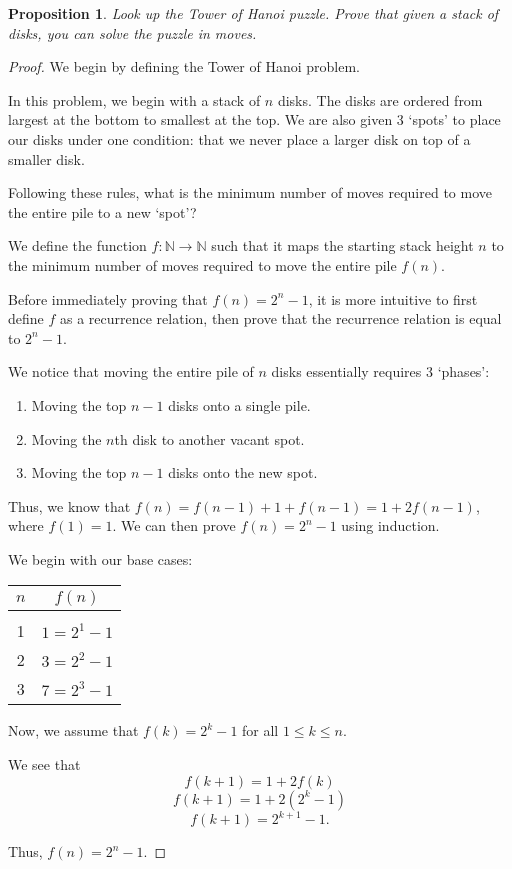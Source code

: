 \documentclass{article}
\newtheorem{proposition}{Proposition}
\theoremstyle{definition}
\begin{document}
\begin{proposition}
Look up the Tower of Hanoi puzzle. Prove that given a stack of 
disks, you can solve the puzzle in moves.

\end{proposition}
\begin{proof}
    We begin by defining the Tower of Hanoi problem. 
    
    In this problem, we begin 
    with a stack of \(n\) disks. The disks are ordered from largest at the bottom 
    to smallest at the top. We are also given 3 `spots' to place our disks under 
    one condition: that we never place a larger disk on top of a smaller disk. 

    Following these rules, what is the minimum number of moves required to move
    the entire pile to a new `spot'?
    
    We define the function \(f: \mathbb{N} \rightarrow \mathbb{N}\) such that it 
    maps the starting stack height \(n\) to the minimum number of moves required 
    to move the entire pile \(f(n)\).

    Before immediately proving that \(f(n) = 2^n - 1\), it is more intuitive to 
    first define \(f\) as a recurrence relation, then prove that the recurrence
    relation is equal to \(2^n -1\).

    We notice that moving the entire pile  of \(n\) disks essentially requires 3 `phases':
    \begin{enumerate}
        \item Moving the top \(n-1\) disks onto a single pile.
        \item Moving the \(n\)th disk to another vacant spot.
        \item Moving the top \(n-1\) disks onto the new spot.
    \end{enumerate}

    Thus, we know that \(f(n) = f(n-1) + 1 + f(n-1) = 1 + 2f(n-1)\), where \(f(1) = 1\).
    We can then prove \(f(n) = 2^n -1\) using induction. 

    We begin with our base cases:
    \begin{center}
        \begin{tabular}{c c}
            \(n\)   & \(f(n)\) \\
            \hline \\
            1       & \(1 = 2^1 - 1\)\\
            2       & \(3 = 2^2 - 1\) \\
            3       & \(7 = 2^3 - 1\) \\
        \end{tabular}
    \end{center}

    Now, we assume that \(f(k) = 2^k -1 \) for all \(1 \le k \le n\).
    
    We see that
    \[f(k+1) = 1 + 2f(k)\]
    \[f(k+1) = 1 + 2(2^k - 1)\]
    \[f(k+1) = 2^{k+1} - 1.\]

    Thus, \(f(n) = 2^n - 1\).
\end{proof}
\end{document}
